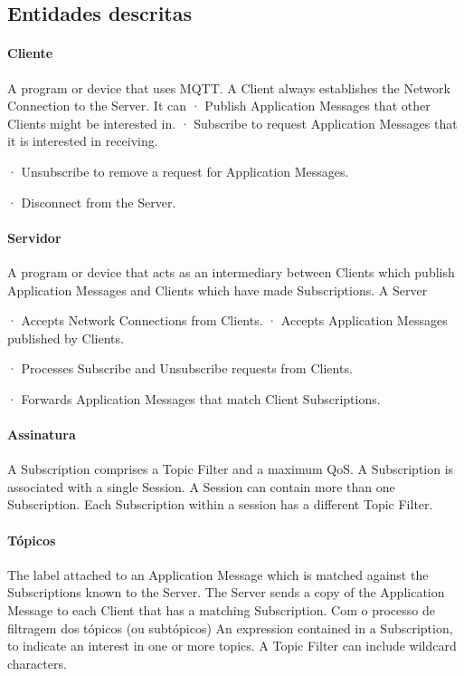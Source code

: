 \subsection{Entidades descritas}

\paragraph{Cliente}
A program or device that uses MQTT. A Client always establishes the Network Connection to the Server. It can
·         Publish Application Messages that other Clients might be interested in.
·         Subscribe to request Application Messages that it is interested in receiving.

·         Unsubscribe to remove a request for Application Messages.

·         Disconnect from the Server.

\paragraph{Servidor}
A program or device that acts as an intermediary between Clients which publish Application Messages and Clients which have made Subscriptions. A Server

·         Accepts Network Connections from Clients.
·         Accepts Application Messages published by Clients.

·         Processes Subscribe and Unsubscribe requests from Clients.

·         Forwards Application Messages that match Client Subscriptions.


\paragraph{Assinatura} A Subscription comprises a Topic Filter and a maximum QoS. A Subscription is associated with a single Session. A Session can contain more than one Subscription. Each Subscription within a session has a different Topic Filter.

\paragraph{Tópicos} The label attached to an Application Message which is matched against the Subscriptions known to the Server. The Server sends a copy of the Application Message to each Client that has a matching Subscription.
Com o processo de filtragem dos tópicos (ou subtópicos) An expression contained in a Subscription, to indicate an interest in one or more topics. A Topic Filter can include wildcard characters.

